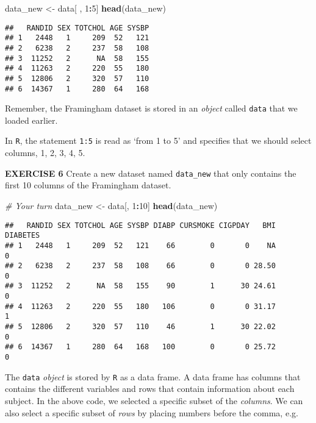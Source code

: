 \documentclass[
]{article}
\newenvironment{Shaded}{\begin{snugshade}}{\end{snugshade}}
\newcommand{\CommentTok}[1]{\textcolor[rgb]{0.56,0.35,0.01}{\textit{#1}}}
\newcommand{\DecValTok}[1]{\textcolor[rgb]{0.00,0.00,0.81}{#1}}
\newcommand{\KeywordTok}[1]{\textcolor[rgb]{0.13,0.29,0.53}{\textbf{#1}}}
\newcommand{\NormalTok}[1]{#1}
\newcommand{\OperatorTok}[1]{\textcolor[rgb]{0.81,0.36,0.00}{\textbf{#1}}}
\newcommand{\StringTok}[1]{\textcolor[rgb]{0.31,0.60,0.02}{#1}}
\begin{document}
\begin{Shaded}
\begin{Highlighting}[]
\NormalTok{data_new <-}\StringTok{ }\NormalTok{data[ , }\DecValTok{1}\OperatorTok{:}\DecValTok{5}\NormalTok{]}
\KeywordTok{head}\NormalTok{(data_new)}
\end{Highlighting}
\end{Shaded}

\begin{verbatim}
##   RANDID SEX TOTCHOL AGE SYSBP
## 1   2448   1     209  52   121
## 2   6238   2     237  58   108
## 3  11252   2      NA  58   155
## 4  11263   2     220  55   180
## 5  12806   2     320  57   110
## 6  14367   1     280  64   168
\end{verbatim}

Remember, the Framingham dataset is stored in an \emph{object} called
\texttt{data} that we loaded earlier.

In \texttt{R}, the statement \texttt{1:5} is read as `from 1 to 5' and
specifies that we should select columns, 1, 2, 3, 4, 5.

\textbf{EXERCISE 6} Create a new dataset named \texttt{data\_new} that
only contains the first 10 columns of the Framingham dataset.

\begin{Shaded}
\begin{Highlighting}[]
\CommentTok{# Your turn}
\NormalTok{data_new <-}\StringTok{ }\NormalTok{data[, }\DecValTok{1}\OperatorTok{:}\DecValTok{10}\NormalTok{]}
\KeywordTok{head}\NormalTok{(data_new)}
\end{Highlighting}
\end{Shaded}

\begin{verbatim}
##   RANDID SEX TOTCHOL AGE SYSBP DIABP CURSMOKE CIGPDAY   BMI DIABETES
## 1   2448   1     209  52   121    66        0       0    NA        0
## 2   6238   2     237  58   108    66        0       0 28.50        0
## 3  11252   2      NA  58   155    90        1      30 24.61        0
## 4  11263   2     220  55   180   106        0       0 31.17        1
## 5  12806   2     320  57   110    46        1      30 22.02        0
## 6  14367   1     280  64   168   100        0       0 25.72        0
\end{verbatim}

The \texttt{data} \emph{object} is stored by \texttt{R} as a data frame.
A data frame has columns that contains the different variables and rows
that contain information about each subject. In the above code, we
selected a specific subset of the \emph{columns}. We can also select a
specific subset of \emph{rows} by placing numbers before the comma,
e.g.~
\end{document}
